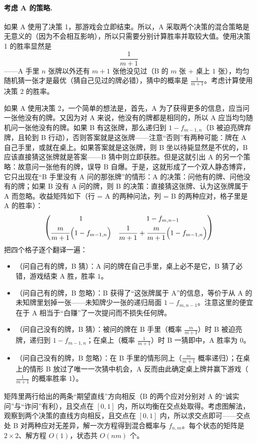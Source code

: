 \paragraph{考虑 A 的策略.} 如果 A 使用了决策 1，那游戏会立即结束。所以，A 采取两个决策的混合策略是无意义的（因为不会相互影响），所以只需要分别计算胜率并取较大值。使用决策 1 的胜率显然是
\[
 \frac{1}{m+1}
\]
——A 手里 $n$ 张牌以外还有 $m+1$ 张他没见过（B 的 $m$ 张 + 桌上 $1$ 张），均匀随机猜一张才是最优（猜自己见过的牌必错），猜中的概率是 $\tfrac1{m+1}$。考虑计算使用决策 2 的胜率。

如果 A 使用决策 2，一个简单的想法是，首先，A 为了获得更多的信息，应当问一张他没有的牌。又因为对 A 来说，他没有的牌都是相同的，所以 A 应当均匀随机问一张他没有的牌。如果 B 有这张牌，那么递归到 $1-f_{m-1,n}$（B 被迫亮牌弃牌，且轮到 B 行动），否则答案就是这张牌——注意“否则”有两种可能：牌在 A 自己手里，或就在桌上。如果答案就是这张牌，则 B 坐以待毙显然是不优的，B 应该直接猜这张牌就是答案——B 猜中则立即获胜。但是这就引出 A 的另一个策略：故意问一张他有的牌，误导 B 自爆。于是，这就形成了一个双人静态博弈，它只出现在“B 手里没有 A 问的那张牌”的情形：A 的决策：问他有的牌、问他没有的牌；如果 B 没有 A 问的牌，则 B 的决策：直接猜这张牌、认为这张牌属于 A 而忽略。收益矩阵如下（行 = A 的两种问法，列 = B 的两种应对，格子里是 A 的胜率）：
\[
 \begin{pmatrix}
 1 & 1-f_{m,n-1}\\[4pt]
 \dfrac{m}{m+1}\Bigl(1-f_{m-1,n}\Bigr) & \dfrac{1}{m+1}+\dfrac{m}{m+1}\Bigl(1-f_{m-1,n}\Bigr)
 \end{pmatrix}
\]
把四个格子逐个翻译一遍：
\begin{itemize}
\item （问自己有的牌，B 猜）：A 问的牌在自己手里，桌上必不是它，B 猜了必错，游戏结束 A 胜，胜率 $1$。
\item （问自己有的牌，B 忽略）：B 获得了“这张牌属于 A”的信息，等价于从 A 的未知牌里划掉一张——未知牌少一张的递归局面 $1-f_{m,n-1}$。注意这里的便宜在于 A 相当于“白赚”了一次提问而不损失任何牌。
\item （问自己没有的牌，B 猜）：被问的牌在 B 手里（概率 $\tfrac{m}{m+1}$）时 B 被迫亮牌，递归到 $1-f_{m-1,n}$；在桌上（概率 $\tfrac1{m+1}$）时 B 一猜即中，A 胜率为 $0$。
\item （问自己没有的牌，B 忽略）：在 B 手里的情形同上（$\tfrac{m}{m+1}$ 概率递归）；在桌上的情形 B 放过了唯一一次猜中机会，A 反而由此确定桌上牌并赢下游戏（$\tfrac1{m+1}$ 的概率胜率 $1$）。
\end{itemize}
矩阵里两行给出的两条“期望直线”方向相反（B 的两个应对分别对 A 的“诚实问”与“诈问”有利），且交点在 $[0,1]$ 内，所以均衡在交点处取得。考虑图解法，观察到两个决策的直线方向相反，且交点在 $[0,1]$ 内，所以求交点即可——交点处 B 对两种应对无差异，解一次方程得到混合概率与 $f_{n,m}$。每个状态的矩阵是 $2\times2$、解方程 $O(1)$，状态共 $O(nm)$ 个。


